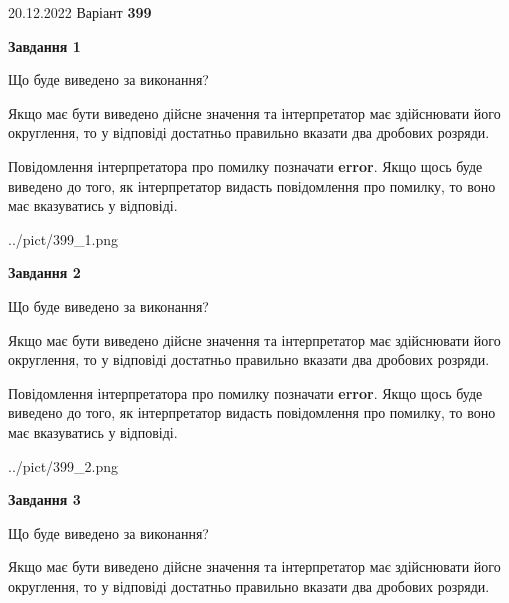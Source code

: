\documentclass[12pt, ukrainian]{article}
\begin{document}
{20.12.2022 Варіант \No \textbf { 399 }\par}
{
\begin {Large}

{\begin {center}\textbf{Завдання 1}\end {center}}\par
Що буде виведено за виконання? \par

Якщо має бути виведено дійсне значення та інтерпретатор має здійснювати його округлення, 
то у відповіді достатньо правильно вказати два дробових розряди.

Повідомлення інтерпретатора про помилку позначати \textbf{error}.
Якщо щось буде виведено до того, як інтерпретатор видасть повідомлення про помилку, 
то воно має вказуватись у відповіді. \par

\begin{center}
	{../pict/399_1.png}
\end{center}
\newpage

{\begin {center}\textbf{Завдання 2}\end {center}}\par
Що буде виведено за виконання? \par

Якщо має бути виведено дійсне значення та інтерпретатор має здійснювати його округлення, 
то у відповіді достатньо правильно вказати два дробових розряди.

Повідомлення інтерпретатора про помилку позначати \textbf{error}.
Якщо щось буде виведено до того, як інтерпретатор видасть повідомлення про помилку, 
то воно має вказуватись у відповіді. \par

\begin{center}
	{../pict/399_2.png}
\end{center}
\newpage

{\begin {center}\textbf{Завдання 3}\end {center}}\par
Що буде виведено за виконання? \par

Якщо має бути виведено дійсне значення та інтерпретатор має здійснювати його округлення, 
то у відповіді достатньо правильно вказати два дробових розряди.


\end{Large}}
\end{document}

